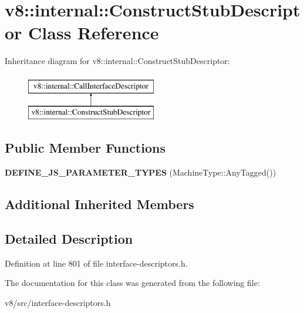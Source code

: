 \hypertarget{classv8_1_1internal_1_1ConstructStubDescriptor}{}\section{v8\+:\+:internal\+:\+:Construct\+Stub\+Descriptor Class Reference}
\label{classv8_1_1internal_1_1ConstructStubDescriptor}
Inheritance diagram for v8\+:\+:internal\+:\+:Construct\+Stub\+Descriptor\+:\begin{figure}[H]
\begin{center}
\leavevmode
\includegraphics[height=2.000000cm]{classv8_1_1internal_1_1ConstructStubDescriptor}
\end{center}
\end{figure}
\subsection*{Public Member Functions}
\begin{DoxyCompactItemize}
\item 
\mbox{\label{classv8_1_1internal_1_1ConstructStubDescriptor_a6ba8a231e389ae551c29f2c67e5daeb4}} 
{\bfseries D\+E\+F\+I\+N\+E\+\_\+\+J\+S\+\_\+\+P\+A\+R\+A\+M\+E\+T\+E\+R\+\_\+\+T\+Y\+P\+ES} (Machine\+Type\+::\+Any\+Tagged())
\end{DoxyCompactItemize}
\subsection*{Additional Inherited Members}


\subsection{Detailed Description}


Definition at line 801 of file interface-\/descriptors.\+h.



The documentation for this class was generated from the following file\+:\begin{DoxyCompactItemize}
\item 
v8/src/interface-\/descriptors.\+h\end{DoxyCompactItemize}
